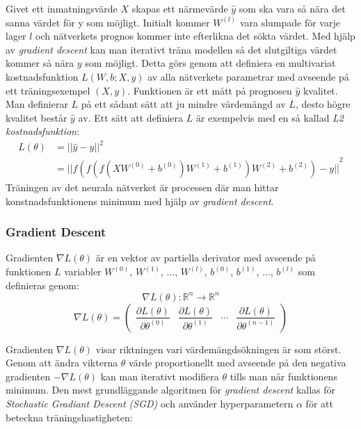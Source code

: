 \documentclass[a4paper,11pt,twoside]{article}
\newcommand*{\pd}[2]{\ensuremath{\dfrac{\partial #1}{\partial #2}}}
\begin{document}
Givet ett inmatningsvärde $X$ skapas ett närmevärde $\hat{y}$ som ska vara så nära det sanna värdet för y som möjligt. Initialt kommer $W^{(l)}$ vara slumpade för varje lager $l$ och nätverkets prognos kommer inte efterlikna det sökta värdet. Med hjälp av \textit{gradient descent} kan man iterativt träna modellen så det slutgiltiga värdet kommer så nära $y$ som möjligt. Detta görs genom att definiera en multivariat kostnadsfunktion $L(W, b; X,y)$ av alla nätverkets parametrar med avseende på ett träningsexempel $(X, y)$. Funktionen är ett mått på prognosen $\hat{y}$ kvalitet. Man definierar $L$ på ett sådant sätt att ju mindre värdemängd av $L$, desto högre kvalitet består $\hat{y}$ av. Ett sätt att definiera $L$ är exempelvis med en så kallad \textit{L2 kostnadsfunktion}: \cite{cs231n} \cite{wikiStanford}
\begin{equation}
\begin{split}
L(\theta) 	& = {||\hat{y}-y||}^2 \\
		& = {||f(f(f(XW^{(0)} +b^{(0)})W^{(1)} +b^{(1)})W^{(2)} +b^{(2)}) - y||}^2
\end{split}
\end{equation}
Träningen av det neurala nätverket är processen där man hittar konstnadsfunktionens minimum med hjälp av \textit{gradient descent}.

\subsubsection{Gradient Descent}
Gradienten $\nabla L(\theta)$ är en vektor av partiella derivator med avseende på funktionen $L$ variabler $W^{(0)}$, $W^{(1)}$, ..., $W^{(l)}$, $b^{(0)}$, $b^{(1)}$, ..., $b^{(l)}$ som definieras genom: \cite{gradient} \cite{convmath} 
\begin{equation}
\nabla L(\theta) : \mathbb{R}^n \to \mathbb{R}^n
\end{equation}
\begin{equation}
\nabla L(\theta) = 
	\begin{pmatrix} 
		\pd{L(\theta)}{\theta^{(0)}} & 
		\pd{L(\theta)}{\theta^{(1)}} &
		\cdots &
		\pd{L(\theta)}{\theta^{(n-1)}}
		
		\end{pmatrix}
\end{equation}

Gradienten $\nabla L(\theta)$ visar riktningen vari värdemängdsökningen är som störst. Genom att ändra vikterna $\theta$ värde proportionellt med avseende på den negativa gradienten $-\nabla L(\theta)$ kan man iterativt modifiera $\theta$ tills man når funktionens minimum. Den mest grundläggande algoritmen för \textit{gradient descent} kallas för \textit{Stochastic Gradiant Descent (SGD)} och använder hyperparametern $\alpha$ för att beteckna träningshastigheten: \cite{gradient} \cite{convmath} \cite{wikiStanford}
\end{document}
